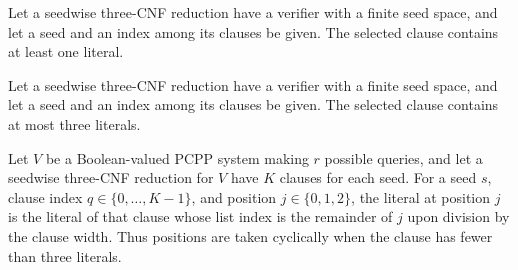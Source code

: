 \begin{theorem}
\label{FABL.SeedwiseThreeCNFReduction.clause_nonempty'}
\leanok
{}
Let a seedwise three-CNF reduction have a verifier with a finite seed space, and let a
seed and an index among its clauses be given. The selected clause contains at least one
literal.
\end{theorem}

\begin{theorem}
\label{FABL.SeedwiseThreeCNFReduction.clause_width_le}
\leanok
{}
Let a seedwise three-CNF reduction have a verifier with a finite seed space, and let a
seed and an index among its clauses be given. The selected clause contains at most three
literals.
\end{theorem}

\begin{definition}
\label{FABL.SeedwiseThreeCNFReduction.literal}
\leanok
{}
Let $V$ be a Boolean-valued PCPP system making $r$ possible queries, and let a seedwise
three-CNF reduction for $V$ have $K$ clauses for each seed. For a seed $s$, clause index
$q\in\{0,\ldots,K-1\}$, and position $j\in\{0,1,2\}$, the literal at position $j$ is the
literal of that clause whose list index is the remainder of $j$ upon division by the
clause width. Thus positions are taken cyclically when the clause has fewer than three
literals.
\end{definition}

